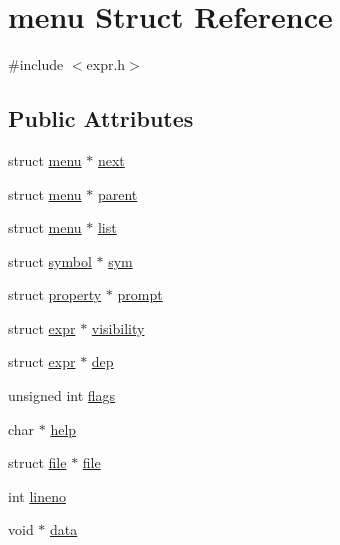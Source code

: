 \hypertarget{structmenu}{\section{menu Struct Reference}
\label{structmenu}
}


{\ttfamily \#include $<$expr.\-h$>$}

\subsection*{Public Attributes}
\begin{DoxyCompactItemize}
\item 
struct \hyperlink{structmenu}{menu} $\ast$ \hyperlink{structmenu_a45b3c151ab09fa1a7c610f6e1434b0c3}{next}
\item 
struct \hyperlink{structmenu}{menu} $\ast$ \hyperlink{structmenu_ab37f2faa5398d13b27ca50dcfd4e36e4}{parent}
\item 
struct \hyperlink{structmenu}{menu} $\ast$ \hyperlink{structmenu_ac08df28efcd13c950848efd4701c7997}{list}
\item 
struct \hyperlink{structsymbol}{symbol} $\ast$ \hyperlink{structmenu_a0ba1034a38638e364526407d5ae98c1f}{sym}
\item 
struct \hyperlink{structproperty}{property} $\ast$ \hyperlink{structmenu_a41dea0b424c67721b50a13a00c4c57b9}{prompt}
\item 
struct \hyperlink{structexpr}{expr} $\ast$ \hyperlink{structmenu_a45459a85f3d75f307aaf0e37f5a79357}{visibility}
\item 
struct \hyperlink{structexpr}{expr} $\ast$ \hyperlink{structmenu_af75a37a9b8796c2c3c1204ee7489da41}{dep}
\item 
unsigned int \hyperlink{structmenu_ab910ce28a259aea500079aff5a01e474}{flags}
\item 
char $\ast$ \hyperlink{structmenu_a459acd63454c281fd66666ef7b8afe74}{help}
\item 
struct \hyperlink{structfile}{file} $\ast$ \hyperlink{structmenu_a7db14073a07042ac38e3504ee12f7840}{file}
\item 
int \hyperlink{structmenu_a3c780bede2c6492249c477f0ae7a8463}{lineno}
\item 
void $\ast$ \hyperlink{structmenu_a0f989fd744677f0e506c9b991c08c128}{data}
\end{DoxyCompactItemize}


